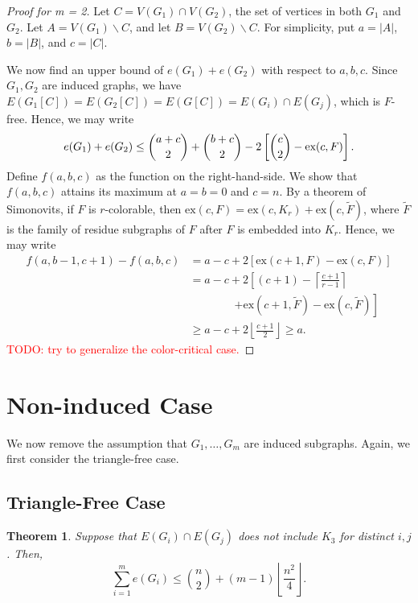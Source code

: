 \documentclass[a4paper]{article}
\newtheorem{theorem}{Theorem}[section]
\begin{document}
\begin{proof}[Proof for m = 2]
  Let $C = V(G_1) \cap V(G_2)$, the set of vertices in both $G_1$ and $G_2$. Let $A = V(G_1)
  \backslash C$, and let $B = V(G_2) \backslash C$. For simplicity, put $a = |A|$, $b = |B|$, and $c
  = |C|$. 

  We now find an upper bound of $e(G_1) + e(G_2)$ with respect to $a, b, c$. Since $G_1, G_2$ are
  induced graphs, we have $E(G_1[C]) = E(G_2[C]) = E(G[C]) = E(G_i) \cap E(G_j)$, which is $F$-free.
  Hence, we may write
  \[
    e(G_1) + e(G_2) \leq \binom{a + c}{2} +  \binom{b + c}{2} - 2\left[\binom{c}{2} - \textnormal{ex}(c, F)\right].
  \]
  Define $f(a, b, c)$ as the function on the right-hand-side. We show that $f(a, b, c)$ attains its
  maximum at $a = b = 0$ and $c = n$. By a theorem of Simonovits, if $F$ is $r$-colorable, then
  $\text{ex}(c, F) = \text{ex}(c, K_r) + \text{ex}(c, \tilde{F})$, where $\tilde{F}$ is the family
  of residue subgraphs of $F$ after $F$ is embedded into $K_r$. Hence, we may write
  \begin{align*}
    f(a, b - 1, c + 1) - f(a, b, c)
    &= a - c + 2[\text{ex}(c + 1, F) - \text{ex}(c, F)] \\
    &= a - c + 2\left[(c + 1) - \left\lceil \frac{c + 1}{r - 1} \right\rceil \right. \\
    &\qquad\qquad \left. + \text{ex}(c + 1, \tilde{F}) - \text{ex}(c, \tilde{F})\right] \\
    &\geq a - c + 2\left\lfloor \frac{c + 1}{2} \right\rfloor \geq a.
  \end{align*}
  \textcolor{red}{TODO: try to generalize the color-critical case.}
\end{proof}

\section{Non-induced Case}

We now remove the assumption that $G_1, \dots, G_m$ are induced subgraphs. Again, we first consider
the triangle-free case.

\subsection{Triangle-Free Case}

\begin{theorem}
  Suppose that $E(G_i) \cap E(G_j)$ does not include $K_3$ for distinct $i, j$. Then,
  \[
    \sum_{i = 1}^m e(G_i) \leq \binom{n}{2} + (m - 1)\left\lfloor\frac{n^2}{4}\right\rfloor.
  \]
\end{theorem}
\end{document}
